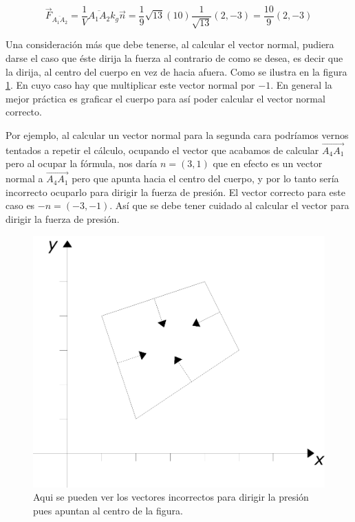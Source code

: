 $$\vec{F}_{\overline{A_1 A_2}} = \frac{1}{V}\overline{A_1 A_2} k_g \vec{n} = \frac{1}{9} \sqrt{13} \left( 10 \right)  \frac{1}{\sqrt{13}} (2, -3) = \frac{10}{9}(2, -3) $$

Una consideración más que debe tenerse, al calcular el vector normal, pudiera darse el caso que éste dirija la fuerza al contrario de como se desea, es decir que la dirija, al centro del cuerpo en vez de hacia afuera. Como se ilustra en la figura \ref{presionMal:fig}. En cuyo caso hay que multiplicar este vector normal por $-1$. En general la mejor práctica es graficar el cuerpo para así poder calcular el vector normal correcto.

Por ejemplo, al calcular un vector normal para la segunda cara podríamos vernos tentados a repetir el cálculo, ocupando el vector que acabamos de calcular $\overrightarrow{A_4 A_1}$ pero al ocupar la fórmula, nos daría $n=(3,1)$ que en efecto es un vector normal a $\overrightarrow{A_4 A_1}$ pero que apunta hacia el centro del cuerpo, y por lo tanto sería incorrecto ocuparlo para dirigir la fuerza de presión. El vector correcto para este caso es $-n = (-3,-1)$. Así que se debe tener cuidado al calcular el vector para dirigir la fuerza de presión.

\begin{figure}
 \centering
 \includegraphics[]{Img/presion_mal}
 \caption[Vectores de presión incorrectos]{ 
 Aqui se pueden ver los vectores incorrectos para dirigir la presión pues apuntan al centro de la figura.
 } \label{presionMal:fig}
\end{figure}

